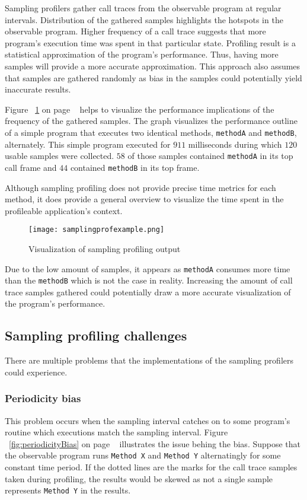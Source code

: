 \documentclass[..thesis.tex]{subfiles}
\begin{document}
Sampling profilers gather call traces from the observable program at regular intervals. Distribution of the gathered samples highlights the hotspots in the observable program. Higher frequency of a call trace suggests that more program's execution time was spent in that particular state. Profiling result is a statistical approximation of the program's performance. Thus, having more samples will provide a more accurate approximation. This approach also assumes that samples are gathered randomly as bias in the samples could potentially yield inaccurate results. 

Figure ~\ref{fig:samplingProf} on page ~\pageref{fig:samplingProf} helps to visualize the performance implications of the frequency of the gathered samples. The graph visualizes the performance outline of a simple program that executes two identical methods, \texttt{methodA} and \texttt{methodB}, alternately. This simple program executed for $911$ milliseconds during which $120$ usable samples were collected. $58$ of those samples contained \texttt{methodA} in its top call frame and $44$ contained \texttt{methodB} in its top frame.

Although sampling profiling does not provide precise time metrics for each method, it does provide a general overview to visualize the time spent in the profileable application's context. 

\begin{figure}[H]
\texttt{[image: samplingprofexample.png]}
\caption{Visualization of sampling profiling output}
\label{fig:samplingProf}
\end{figure}
Due to the low amount of samples, it appears as \texttt{methodA} consumes more time than the \texttt{methodB} which is not the case in reality. Increasing the amount of call trace samples gathered could potentially draw a more accurate visualization of the program's performance.

\subsection{Sampling profiling challenges}
There are multiple problems that the implementations of the sampling profilers could experience.
\subsubsection{Periodicity bias}
This problem occurs when the sampling interval catches on to some program's routine which executions match the sampling interval. Figure ~\ref{fig:periodicityBias} on page ~\pageref{fig:periodicityBias} illustrates the issue behing the bias. Suppose that the observable program runs \texttt{Method X} and \texttt{Method Y} alternatingly for some constant time period. If the dotted lines are the marks for the call trace samples taken during profiling, the results would be skewed as not a single sample represents \texttt{Method Y} in the results.
\end{document}
